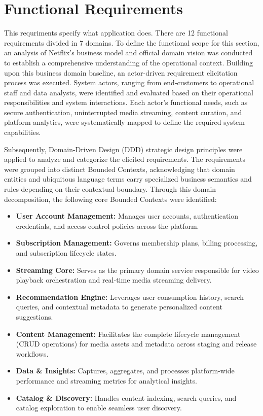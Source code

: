 \documentclass{article}
\begin{document}
\section{Functional Requirements}
This requriments specify what application does. There are 12 functional requirements divided in 7 domains.
To define the functional scope for this section, an analysis of Netflix's business model and official domain vision was conducted to establish a comprehensive understanding of the operational context. Building upon this business domain baseline, an actor-driven requirement elicitation process was executed. System actors, ranging from end-customers to operational staff and data analysts, were identified and evaluated based on their operational responsibilities and system interactions. Each actor's functional needs, such as secure authentication, uninterrupted media streaming, content curation, and platform analytics, were systematically mapped to define the required system capabilities.

Subsequently, Domain-Driven Design (DDD) strategic design principles were applied to analyze and categorize the elicited requirements. The requirements were grouped into distinct Bounded Contexts, acknowledging that domain entities and ubiquitous language terms carry specialized business semantics and rules depending on their contextual boundary. Through this domain decomposition, the following core Bounded Contexts were identified:

\begin{itemize}
    \item \textbf{User Account Management:} Manages user accounts, authentication credentials, and access control policies across the platform.

    \item \textbf{Subscription Management:} Governs membership plans, billing processing, and subscription lifecycle states.

    \item \textbf{Streaming Core:} Serves as the primary domain service responsible for video playback orchestration and real-time media streaming delivery.

    \item \textbf{Recommendation Engine:} Leverages user consumption history, search queries, and contextual metadata to generate personalized content suggestions.

    \item \textbf{Content Management:} Facilitates the complete lifecycle management (CRUD operations) for media assets and metadata across staging and release workflows.

    \item \textbf{Data \& Insights:} Captures, aggregates, and processes platform-wide performance and streaming metrics for analytical insights.

    \item \textbf{Catalog \& Discovery:} Handles content indexing, search queries, and catalog exploration to enable seamless user discovery.
\end{itemize}
\end{document}
